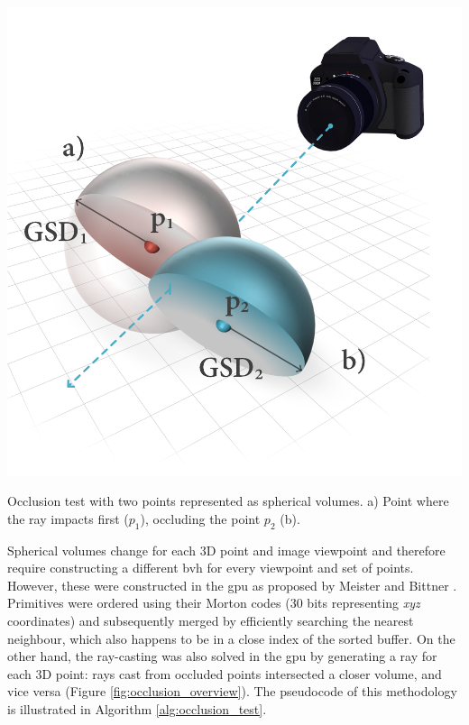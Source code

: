 \begin{marginfigure}[.0cm]
	\centering
	\includegraphics{figs/thermal_projection/occlusion_spheres.png}
	\caption{Occlusion test with two points represented as spherical volumes. a) Point where the ray impacts first ($p_1$), occluding the point $p_2$ (b).}
	\label{fig:occlusion_overview}
\end{marginfigure}
Spherical volumes change for each 3D point and image viewpoint and therefore require constructing a different \acrshort{bvh} for every viewpoint and set of points. However, these were constructed in the \acrshort{gpu} as proposed by Meister and Bittner \cite{meister_parallel_2018}. Primitives were ordered using their Morton codes (30 bits representing \textit{xyz} coordinates) and subsequently merged by efficiently searching the nearest neighbour, which also happens to be in a close index of the sorted buffer. On the other hand, the ray-casting was also solved in the \acrshort{gpu} by generating a ray for each 3D point: rays cast from occluded points intersected a closer volume, and vice versa (Figure \ref{fig:occlusion_overview}). The pseudocode of this methodology is illustrated in Algorithm \ref{alg:occlusion_test}.

